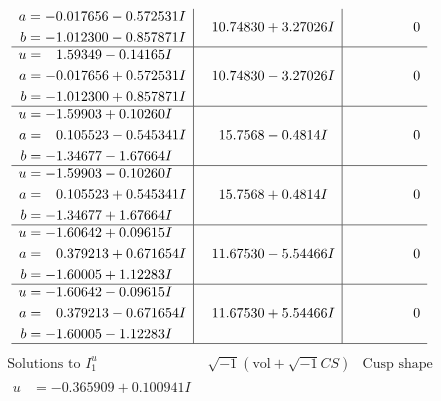 \documentclass[1p]{elsarticle_modified}
\theoremstyle{definition}
\newcommand{\I}{\sqrt{-1}}
\begin{document}
$$\begin{array}{c|c|c}
\begin{aligned}
a &= -0.017656 - 0.572531 I \\
b &= -1.012300 - 0.857871 I\end{aligned}
 & \phantom{-}10.74830 + 3.27026 I & \phantom{-0.000000 } 0 \\ \hline\begin{aligned}
u &= \phantom{-}1.59349 - 0.14165 I \\
a &= -0.017656 + 0.572531 I \\
b &= -1.012300 + 0.857871 I\end{aligned}
 & \phantom{-}10.74830 - 3.27026 I & \phantom{-0.000000 } 0 \\ \hline\begin{aligned}
u &= -1.59903 + 0.10260 I \\
a &= \phantom{-}0.105523 - 0.545341 I \\
b &= -1.34677 - 1.67664 I\end{aligned}
 & \phantom{-}15.7568 - 0.4814 I & \phantom{-0.000000 } 0 \\ \hline\begin{aligned}
u &= -1.59903 - 0.10260 I \\
a &= \phantom{-}0.105523 + 0.545341 I \\
b &= -1.34677 + 1.67664 I\end{aligned}
 & \phantom{-}15.7568 + 0.4814 I & \phantom{-0.000000 } 0 \\ \hline\begin{aligned}
u &= -1.60642 + 0.09615 I \\
a &= \phantom{-}0.379213 + 0.671654 I \\
b &= -1.60005 + 1.12283 I\end{aligned}
 & \phantom{-}11.67530 - 5.54466 I & \phantom{-0.000000 } 0 \\ \hline\begin{aligned}
u &= -1.60642 - 0.09615 I \\
a &= \phantom{-}0.379213 - 0.671654 I \\
b &= -1.60005 - 1.12283 I\end{aligned}
 & \phantom{-}11.67530 + 5.54466 I & \phantom{-0.000000 } 0\\
 \hline 
 \end{array}$$\newpage$$\begin{array}{c|c|c}  
\text{Solutions to }I^u_{1}& \I (\text{vol} + \sqrt{-1}CS) & \text{Cusp shape}\\
 \hline 
\begin{aligned}
u &= -0.365909 + 0.100941 I \\

\end{aligned}
\end{array}$$
\end{document}
